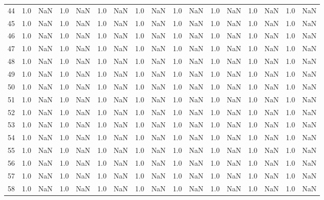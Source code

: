 \begin{tabular}{lrrrrrrrrrrrrrrrr}
     44 &  1.0 & NaN &   1.0 &   NaN &   1.0 &   NaN &   1.0 &   NaN &   1.0 &   NaN &   1.0 &   NaN &   1.0 &   NaN &   1.0 &   NaN \\
     45 &  1.0 & NaN &   1.0 &   NaN &   1.0 &   NaN &   1.0 &   NaN &   1.0 &   NaN &   1.0 &   NaN &   1.0 &   NaN &   1.0 &   NaN \\
     46 &  1.0 & NaN &   1.0 &   NaN &   1.0 &   NaN &   1.0 &   NaN &   1.0 &   NaN &   1.0 &   NaN &   1.0 &   NaN &   1.0 &   NaN \\
     47 &  1.0 & NaN &   1.0 &   NaN &   1.0 &   NaN &   1.0 &   NaN &   1.0 &   NaN &   1.0 &   NaN &   1.0 &   NaN &   1.0 &   NaN \\
     48 &  1.0 & NaN &   1.0 &   NaN &   1.0 &   NaN &   1.0 &   NaN &   1.0 &   NaN &   1.0 &   NaN &   1.0 &   NaN &   1.0 &   NaN \\
     49 &  1.0 & NaN &   1.0 &   NaN &   1.0 &   NaN &   1.0 &   NaN &   1.0 &   NaN &   1.0 &   NaN &   1.0 &   NaN &   1.0 &   NaN \\
     50 &  1.0 & NaN &   1.0 &   NaN &   1.0 &   NaN &   1.0 &   NaN &   1.0 &   NaN &   1.0 &   NaN &   1.0 &   NaN &   1.0 &   NaN \\
     51 &  1.0 & NaN &   1.0 &   NaN &   1.0 &   NaN &   1.0 &   NaN &   1.0 &   NaN &   1.0 &   NaN &   1.0 &   NaN &   1.0 &   NaN \\
     52 &  1.0 & NaN &   1.0 &   NaN &   1.0 &   NaN &   1.0 &   NaN &   1.0 &   NaN &   1.0 &   NaN &   1.0 &   NaN &   1.0 &   NaN \\
     53 &  1.0 & NaN &   1.0 &   NaN &   1.0 &   NaN &   1.0 &   NaN &   1.0 &   NaN &   1.0 &   NaN &   1.0 &   NaN &   1.0 &   NaN \\
     54 &  1.0 & NaN &   1.0 &   NaN &   1.0 &   NaN &   1.0 &   NaN &   1.0 &   NaN &   1.0 &   NaN &   1.0 &   NaN &   1.0 &   NaN \\
     55 &  1.0 & NaN &   1.0 &   NaN &   1.0 &   NaN &   1.0 &   NaN &   1.0 &   NaN &   1.0 &   NaN &   1.0 &   NaN &   1.0 &   NaN \\
     56 &  1.0 & NaN &   1.0 &   NaN &   1.0 &   NaN &   1.0 &   NaN &   1.0 &   NaN &   1.0 &   NaN &   1.0 &   NaN &   1.0 &   NaN \\
     57 &  1.0 & NaN &   1.0 &   NaN &   1.0 &   NaN &   1.0 &   NaN &   1.0 &   NaN &   1.0 &   NaN &   1.0 &   NaN &   1.0 &   NaN \\
     58 &  1.0 & NaN &   1.0 &   NaN &   1.0 &   NaN &   1.0 &   NaN &   1.0 &   NaN &   1.0 &   NaN &   1.0 &   NaN &   1.0 &   NaN \\

\end{tabular}
